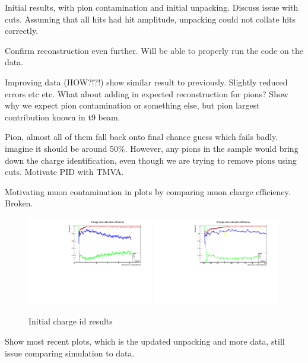 Initial results, with pion contamination and initial unpacking. Discuss issue with cuts. Assuming that all hits had hit amplitude, unpacking could not collate hits correctly.

Confirm reconstruction even further. Will be able to properly run the code on the data.


Improving data (HOW?!?!) show similar result to previously. Slightly reduced errors etc etc. What about adding in expected reconstruction for pions? Show why we expect pion contamination or something else, but pion largest contribution known in t9 beam. 

Pion, almost all of them fall back onto final chance guess which fails badly. imagine it should be around 50\%. However, any pions in the sample would bring down the charge identification, even though we are trying to remove pions using cuts. Motivate PID with TMVA.

Motivating muon contamination in plots by comparing muon charge efficiency. Broken.

\begin{figure}[h!]
\centering
\includegraphics[width=0.49\textwidth]{figures/testbeam/TestBeam090318Plots/ChargeIDFullWPion.pdf}
\includegraphics[width=0.49\textwidth]{figures/testbeam/TestBeam090318Plots/ChargeIDFullLowWPion.pdf}
\caption{Initial charge id results}
\label{fig:ChargeImprovedPion}
\end{figure}


Show most recent plots, which is the updated unpacking and more data, still issue comparing simulation to data. 

